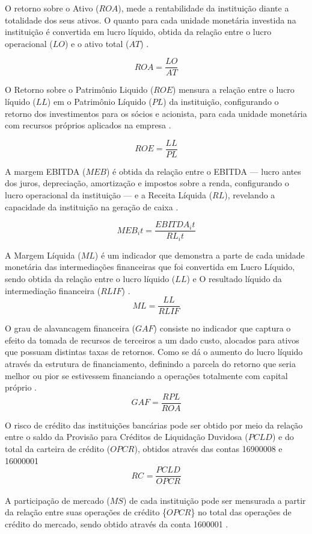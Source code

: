 \documentclass[12pt,12pt,openright,oneside,a4paper,chapter=TITLE,section=TITLE,subsection=TITLE,subsubsection=TITLE,english,french,spanish,portugues,sumario=tradicional]{abntex2}
\begin{document}
O retorno sobre o Ativo (\(ROA\)), mede a rentabilidade da instituição diante a totalidade dos seus ativos. O quanto para cada unidade monetária investida na instituição é convertida em lucro líquido, obtida da relação entre o lucro operacional (\(LO\)) e o ativo total (\(AT\)) \cite{assaf:2020}.

\[
ROA = \frac{LO}{AT}
\]

O Retorno sobre o Patrimônio Liquido (\(ROE\)) mensura a relação entre o lucro líquido (\(LL\)) em o Patrimônio Líquido (\(PL\)) da instituição, configurando o retorno dos investimentos para os sócios e acionista, para cada unidade monetária com recursos próprios aplicados na empresa \cite{assaf:2020}.

\[
ROE = \frac{LL}{PL}
\]

A margem EBITDA (\(MEB\)) é obtida da relação entre o EBITDA --- lucro antes dos juros, depreciação, amortização e impostos sobre a renda, configurando o lucro operacional da instituição --- e a Receita Líquida (\(RL\)), revelando a capacidade da instituição na geração de caixa \cite{assaf:2020}.

\[
MEB_it = \frac{EBITDA_it}{RL_it}
\]

A Margem Líquida (\(ML\)) é um indicador que demonstra a parte de cada unidade monetária das intermediações financeiras que foi convertida em Lucro Líquido, sendo obtida da relação entre o lucro líquido (\(LL\)) e O resultado líquido da intermediação financeira (\(RLIF\)) \cite{assaf:2020}.
\[
ML = \frac{LL}{RLIF}
\]

O grau de alavancagem financeira (\(GAF\)) consiste no indicador que captura o efeito da tomada de recursos de terceiros a um dado custo, alocados para ativos que possuam distintas taxas de retornos. Como se dá o aumento do lucro líquido através da estrutura de financiamento, definindo a parcela do retorno que seria melhor ou pior se estivessem financiando a operações totalmente com capital próprio \cite{assaf:2020}.
\[
GAF = \frac{RPL}{ROA}
\]

O risco de crédito das instituições bancárias pode ser obtido por meio da relação entre o saldo da Provisão para Créditos de Liquidação Duvidosa (\(PCLD\)) e do total da carteira de crédito (\(OPCR\)), obtidos através das contas 16900008 e 16000001 \cite{dantas:2012}
\[
RC_{} = \frac{PCLD_{}}{OPCR_{}}
\]

A participação de mercado (\(MS\)) de cada instituição pode ser mensurada a partir da relação entre suas operações de crédito \{\(OPCR\)\} no total das operações de crédito do mercado, sendo obtido através da conta 1600001 \cite{dantas:2012}.
\end{document}
